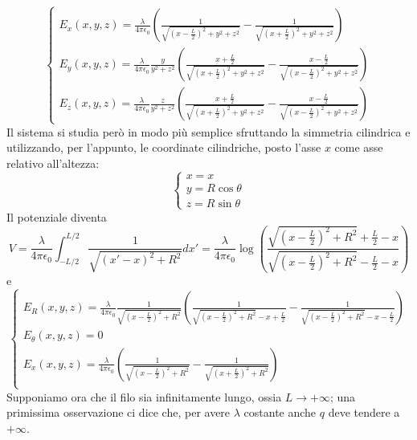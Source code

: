 	\begin{equation*}
		\begin{cases}
			E_x(x,y,z)=\frac{\lambda}{4\pi\epsilon_0}\left(\frac{1}{\sqrt{\left(x-\frac{L}{2}\right)^2+y^2+z^2}}-\frac{1}{\sqrt{\left(x+\frac{L}{2}\right)^2+y^2+z^2}}\right)\\
			E_y(x,y,z)=\frac{\lambda}{4\pi\epsilon_0}\frac{y}{y^2+z^2}\left(\frac{x+\frac{L}{2}}{\sqrt{\left(x+\frac{L}{2}\right)^2+y^2+z^2}}-\frac{x-\frac{L}{2}}{\sqrt{\left(x-\frac{L}{2}\right)^2+y^2+z^2}}\right)\\
			E_z(x,y,z)=\frac{\lambda}{4\pi\epsilon_0}\frac{z}{y^2+z^2}\left(\frac{x+\frac{L}{2}}{\sqrt{\left(x+\frac{L}{2}\right)^2+y^2+z^2}}-\frac{x-\frac{L}{2}}{\sqrt{\left(x-\frac{L}{2}\right)^2+y^2+z^2}}\right)
		\end{cases}
	\end{equation*}
	Il sistema si studia però in modo più semplice sfruttando la simmetria cilindrica e utilizzando, per l'appunto, le coordinate cilindriche, posto l'asse $x$ come asse relativo all'altezza:
	\begin{equation*}
		\begin{cases}
			x=x\\
			y=R\cos\theta\\
			z=R\sin\theta
		\end{cases}
	\end{equation*}
	Il potenziale diventa
	\begin{equation}
		V=\frac{\lambda}{4\pi\epsilon_0}\int_{-L/2}^{L/2}\frac{1}{\sqrt{(x'-x)^2+R^2}}dx'=\frac{\lambda}{4\pi\epsilon_0}\log\left(\frac{\sqrt{\left(x-\frac{L}{2}\right)^2+R^2}+\frac{L}{2}-x}{\sqrt{\left(x-\frac{L}{2}\right)^2+R^2}-\frac{L}{2}-x}\right)
	\end{equation}
	e 
	\begin{equation*}
		\begin{cases}
			E_R(x,y,z)=\frac{\lambda}{4\pi\epsilon_0}\frac{1}{\sqrt{\left(x-\frac{L}{2}\right)^2+R^2}}\left(\frac{1}{\sqrt{\left(x-\frac{L}{2}\right)^2+R^2}-x+\frac{L}{2}}-\frac{1}{\sqrt{\left(x-\frac{L}{2}\right)^2+R^2}-x-\frac{L}{2}}\right)\\
			E_\theta(x,y,z)=0\\
			E_x(x,y,z)=\frac{\lambda}{4\pi\epsilon_0}\left(\frac{1}{\sqrt{\left(x-\frac{L}{2}\right)^2+R^2}}-\frac{1}{\sqrt{\left(x+\frac{L}{2}\right)^2+R^2}}\right)\\
		\end{cases}
	\end{equation*}
	Supponiamo ora che il filo sia infinitamente lungo, ossia $L\to+\infty$; una primissima osservazione ci dice che, per avere $\lambda$ costante anche $q$ deve tendere a $+\infty$.
